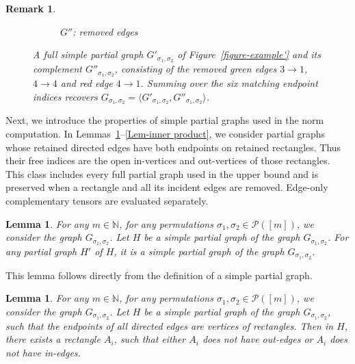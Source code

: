 \documentclass[12pt]{article}
\numberwithin{equation}{section}
\theoremstyle{plain}
\newtheorem{lemma}[theorem]{Lemma}
\newtheorem{remark}[theorem]{Remark}
\def\bN{\mathbb N}
\def\cP{\mathcal P}
\begin{document}
\begin{remark}
\begin{figure}[ht]
\begin{subfigure}[t]{0.32\textwidth}
{%
  }
        \caption{$G''$: removed edges}
    \end{subfigure}
    \caption{A full simple partial graph $G'_{\sigma_1,\sigma_2}$ of Figure~\ref{figure-example'} and its complement $G''_{\sigma_1,\sigma_2}$, consisting of the removed green edges $3\to1$, $4\to4$ and red edge $4\to1$. Summing over the six matching endpoint indices recovers $G_{\sigma_1,\sigma_2} = \langle G'_{\sigma_1,\sigma_2}, G''_{\sigma_1,\sigma_2}\rangle$.}
    \label{figure-inner product'}
\end{figure}
\end{remark}

Next, we introduce the properties of simple partial graphs used in the norm computation. In Lemmas~\ref{Lem-simple}--\ref{Lem-inner product}, we consider partial graphs whose retained directed edges have both endpoints on retained rectangles. Thus their free indices are the open in-vertices and out-vertices of those rectangles. This class includes every full partial graph used in the upper bound and is preserved when a rectangle and all its incident edges are removed. Edge-only complementary tensors are evaluated separately.

\begin{lemma} \label{Lem-simple-subgraph}
For any $m \in \bN$, for any permutations $\sigma_1,\sigma_2 \in \cP([m])$, we consider the graph $G_{\sigma_1,\sigma_2}$. Let $H$ be a simple partial graph of the graph $G_{\sigma_1,\sigma_2}$. For any partial graph $H'$ of $H$, it is a simple partial graph of the graph $G_{\sigma_1,\sigma_2}$.
\end{lemma}

This lemma follows directly from the definition of a simple partial graph.

\begin{lemma} \label{Lem-simple}
For any $m \in \bN$, for any permutations $\sigma_1,\sigma_2 \in \cP([m])$, we consider the graph $G_{\sigma_1,\sigma_2}$. Let $H$ be a simple partial graph of the graph $G_{\sigma_1,\sigma_2}$, such that the endpoints of all directed edges are vertices of rectangles. Then in $H$, there exists a rectangle $A_i$, such that either $A_i$ does not have out-edges or $A_i$ does not have in-edges.
\end{lemma}
\end{document}
